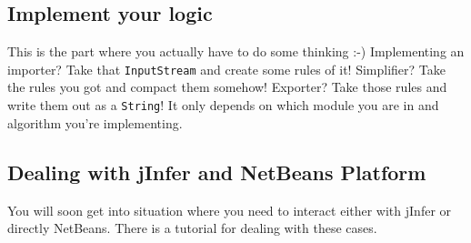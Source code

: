 \documentclass[a4paper,10pt,oneside]{article}
\begin{document}
\subsection*{Implement your logic}
\par 
  This is the part where you actually have to do some thinking :-) Implementing
  an importer? Take that \texttt{InputStream} and create some rules of it! Simplifier?
  Take the rules you got and compact them somehow! Exporter? Take those rules and
  write them out as a \texttt{String}! It only depends on which module you are
  in and algorithm you're implementing.

\subsection*{Dealing with jInfer and NetBeans Platform}
\par 
  You will soon get into situation where you need to interact either with
  jInfer or directly NetBeans. There is a
  tutorial for dealing with these cases.
\end{document}

